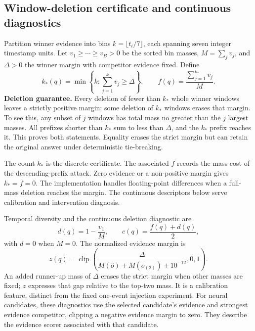 \documentclass[preprint,12pt]{elsarticle}
\begin{document}
\subsection{Window-deletion certificate and continuous diagnostics}
Partition winner evidence into bins $k=\lfloor t_i/7\rfloor$, each spanning seven integer timestamp units. Let $v_1\geq\cdots\geq v_B>0$ be the sorted bin masses, $M=\sum_jv_j$, and $\Delta>0$ the winner margin with competitor evidence fixed. Define
\begin{equation}
 k_*(q)=\min\left\{k:\sum_{j=1}^{k}v_j\geq\Delta\right\},\qquad
 f(q)=\frac{\sum_{j=1}^{k_*}v_j}{M}.
\end{equation}
\textbf{Deletion guarantee.} Every deletion of fewer than $k_*$ whole winner windows leaves a strictly positive margin; some deletion of $k_*$ windows erases that margin. To see this, any subset of $j$ windows has total mass no greater than the $j$ largest masses. All prefixes shorter than $k_*$ sum to less than $\Delta$, and the $k_*$ prefix reaches it. This proves both statements. Equality erases the strict margin but can retain the original answer under deterministic tie-breaking.

The count $k_*$ is the discrete certificate. The associated $f$ records the mass cost of the descending-prefix attack. Zero evidence or a non-positive margin gives $k_*=f=0$. The implementation handles floating-point differences when a full-mass deletion reaches the margin. The continuous descriptors below serve calibration and intervention diagnosis.

Temporal diversity and the continuous deletion diagnostic are
\begin{equation}
 d(q)=1-\frac{v_1}{M},\qquad c(q)=\frac{f(q)+d(q)}{2},
\end{equation}
with $d=0$ when $M=0$. The normalized evidence margin is
\begin{equation}
 z(q)=\operatorname{clip}\left(\frac{\Delta}{M(\hat o)+M(o_{(2)})+10^{-12}},0,1\right).
\end{equation}
An added runner-up mass of $\Delta$ erases the strict margin when other masses are fixed; $z$ expresses that gap relative to the top-two mass. It is a calibration feature, distinct from the fixed one-event injection experiment. For neural candidates, these diagnostics use the selected candidate's evidence and strongest evidence competitor, clipping a negative evidence margin to zero. They describe the evidence scorer associated with that candidate.
\end{document}
